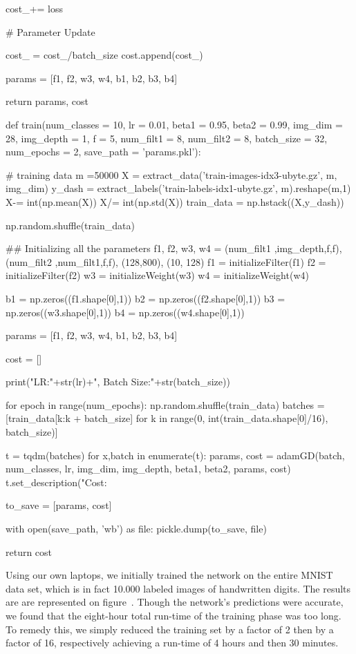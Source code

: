         cost_+= loss

    # Parameter Update  

    

    cost_ = cost_/batch_size
    cost.append(cost_)

    params = [f1, f2, w3, w4, b1, b2, b3, b4]
    
    return params, cost
\stoptyping

\starttyping
def train(num_classes = 10, lr = 0.01, beta1 = 0.95, beta2 = 0.99, img_dim = 28, img_depth = 1, f = 5, num_filt1 = 8, num_filt2 = 8, batch_size = 32, num_epochs = 2, save_path = 'params.pkl'):

    # training data
    m =50000
    X = extract_data('train-images-idx3-ubyte.gz', m, img_dim)
    y_dash = extract_labels('train-labels-idx1-ubyte.gz', m).reshape(m,1)
    X-= int(np.mean(X))
    X/= int(np.std(X))
    train_data = np.hstack((X,y_dash))
    
    np.random.shuffle(train_data)

    ## Initializing all the parameters
    f1, f2, w3, w4 = (num_filt1 ,img_depth,f,f), (num_filt2 ,num_filt1,f,f), (128,800), (10, 128)
    f1 = initializeFilter(f1)
    f2 = initializeFilter(f2)
    w3 = initializeWeight(w3)
    w4 = initializeWeight(w4)

    b1 = np.zeros((f1.shape[0],1))
    b2 = np.zeros((f2.shape[0],1))
    b3 = np.zeros((w3.shape[0],1))
    b4 = np.zeros((w4.shape[0],1))

    params = [f1, f2, w3, w4, b1, b2, b3, b4]

    cost = []

    print("LR:"+str(lr)+", Batch Size:"+str(batch_size))

    for epoch in range(num_epochs):
        np.random.shuffle(train_data)
        batches = [train_data[k:k + batch_size] for k in range(0, int(train_data.shape[0]/16), batch_size)]

        t = tqdm(batches)
        for x,batch in enumerate(t):
            params, cost = adamGD(batch, num_classes, lr, img_dim, img_depth, beta1, beta2, params, cost)
            t.set_description("Cost: %
            
    to_save = [params, cost]
    
    with open(save_path, 'wb') as file:
        pickle.dump(to_save, file)
        
    return cost
\stoptyping
\stopsubsection


\startsubsection[title=Results]
Using our own laptops, we initially trained the network on the entire MNIST data set, which is in fact 10.000 labeled images of handwritten digits.
The results are are represented on figure~\in[results].
Though the network's predictions were accurate, we found that the eight-hour total run-time of the training phase  was too long.
To remedy this, we simply reduced the training set by a factor of 2 then by a factor of 16, respectively achieving a run-time of 4 hours and then 30 minutes.

